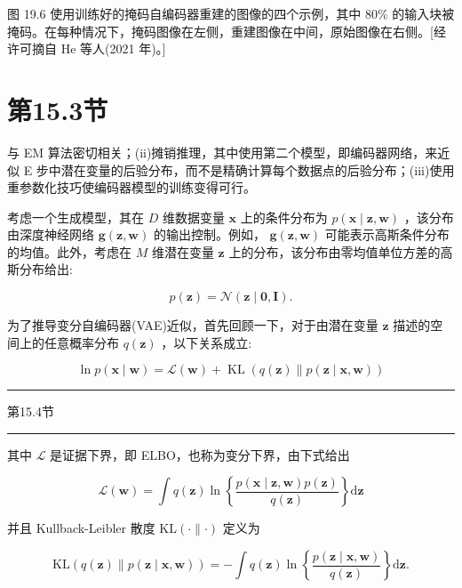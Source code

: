 \documentclass[10pt]{article}
\newcommand{\HRule}{\begin{center}\rule{0.9\linewidth}{0.2mm}\end{center}}
\begin{document}
图 19.6 使用训练好的掩码自编码器重建的图像的四个示例，其中 80\% 的输入块被掩码。在每种情况下，掩码图像在左侧，重建图像在中间，原始图像在右侧。[经许可摘自 He 等人(2021 年)。]

\section*{第15.3节}

与 EM 算法密切相关；(ii)摊销推理，其中使用第二个模型，即编码器网络，来近似 E 步中潜在变量的后验分布，而不是精确计算每个数据点的后验分布；(iii)使用重参数化技巧使编码器模型的训练变得可行。

考虑一个生成模型，其在 \(D\) 维数据变量 \(\mathbf{x}\) 上的条件分布为 \(p\left( {\mathbf{x} \mid  \mathbf{z},\mathbf{w}}\right)\) ，该分布由深度神经网络 \(\mathbf{g}\left( {\mathbf{z},\mathbf{w}}\right)\) 的输出控制。例如， \(\mathbf{g}\left( {\mathbf{z},\mathbf{w}}\right)\) 可能表示高斯条件分布的均值。此外，考虑在 \(M\) 维潜在变量 \(\mathbf{z}\) 上的分布，该分布由零均值单位方差的高斯分布给出:

\[
p\left( \mathbf{z}\right)  = \mathcal{N}\left( {\mathbf{z} \mid  \mathbf{0},\mathbf{I}}\right) . \tag{19.5}
\]

为了推导变分自编码器(VAE)近似，首先回顾一下，对于由潜在变量 \(\mathbf{z}\) 描述的空间上的任意概率分布 \(q\left( \mathbf{z}\right)\) ，以下关系成立:

\[
\ln p\left( {\mathbf{x} \mid  \mathbf{w}}\right)  = \mathcal{L}\left( \mathbf{w}\right)  + \operatorname{KL}\left( {q\left( \mathbf{z}\right) \parallel p\left( {\mathbf{z} \mid  \mathbf{x},\mathbf{w}}\right) }\right)  \tag{19.6}
\]

\HRule

第15.4节

\HRule

其中 \(\mathcal{L}\) 是证据下界，即 ELBO，也称为变分下界，由下式给出

\[
\mathcal{L}\left( \mathbf{w}\right)  = \int q\left( \mathbf{z}\right) \ln \left\{  \frac{p\left( {\mathbf{x} \mid  \mathbf{z},\mathbf{w}}\right) p\left( \mathbf{z}\right) }{q\left( \mathbf{z}\right) }\right\}  \mathrm{d}\mathbf{z} \tag{19.7}
\]

并且 Kullback-Leibler 散度 \(\mathrm{{KL}}\left( {\cdot \parallel  \cdot  }\right)\) 定义为

\[
\mathrm{{KL}}\left( {q\left( \mathbf{z}\right) \parallel p\left( {\mathbf{z} \mid  \mathbf{x},\mathbf{w}}\right) }\right)  =  - \int q\left( \mathbf{z}\right) \ln \left\{  \frac{p\left( {\mathbf{z} \mid  \mathbf{x},\mathbf{w}}\right) }{q\left( \mathbf{z}\right) }\right\}  \mathrm{d}\mathbf{z}. \tag{19.8}
\]
\end{document}
